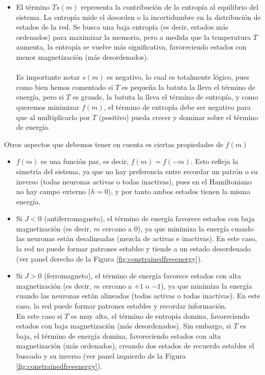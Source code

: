 \begin{description}
\begin{itemize}
        \item El término $T s(m)$ representa la contribución de la entropía al equilibrio del sistema. La entropía mide el desorden o la incertidumbre en la distribución de estados de la red. Se busca una baja entropía (es decir, estados más ordenados) para maximizar la memoria, pero a medida que la temperatura $T$ aumenta, la entropía se vuelve más significativa, favoreciendo estados con menor magnetización (más desordenados). \\ \\
        \noindent
        Es importante notar $s(m)$ es negativo, lo cual es totalmente lógico, pues como bien hemos comentado si $T$ es pequeña la batuta la lleva el término de energía, pero si $T$ es grande, la batuta la lleva el término de entropía, y como queremos minimizar $f(m)$, el término de entropía debe ser negativo para que al multiplicarlo por $T$ (positivo) pueda crecer y dominar sobre el término de energía.
    \end{itemize}
    Otros aspectos que debemos tener en cuenta es ciertas propiedades de $f(m)$
    \begin{itemize}
        \item $f(m)$ es una función par, es decir, $f(m) = f(-m)$. Esto refleja la simetría del sistema, ya que no hay preferencia entre recordar un patrón o su inverso (todas neuronas activas o todas inactivas), pues en el Hamiltoniano no hay campo externo ($h=0$), y por tanto ambos estados tienen la misma energía.
        \item Si $J<0$ (antiferromagneto), el término de energía favorece estados con baja magnetización (es decir, $m$ cercano a $0$), ya que minimiza la energía cuando las neuronas están desalineadas (mezcla de activas e inactivas). En este caso, la red no puede formar patrones estables y tiende a un estado desordenado (ver panel derecho de la Figura \ref{fig:constrainedfreeenergy}). \\
        \item Si $J>0$ (ferromagneto), el término de energía favorece estados con alta magnetización (es decir, $m$ cercano a $+1$ o $-1$), ya que minimiza la energía cuando las neuronas están alineadas (todas activas o todas inactivas). En este caso, la red puede formar patrones estables y recordar información. \\
        \noindent
        En este caso si $T$ es muy alta, el término de entropía domina, favoreciendo estados con baja magnetización (más desordenados). Sin embargo, si $T$ es baja, el término de energía domina, favoreciendo estados con alta magnetización (más ordenados), creando dos estados de recuerdo estables el buscado y su inverso (ver panel izquierdo de la Figura \ref{fig:constrainedfreeenergy}).

\end{itemize}
\end{description}
